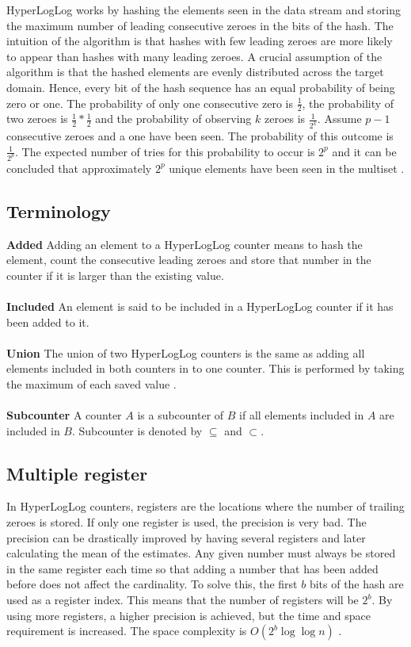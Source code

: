 HyperLogLog works by hashing the elements seen in the data stream and storing the maximum number of leading consecutive zeroes in the bits of the hash. The intuition of the algorithm is that hashes with few leading zeroes are more likely to appear than hashes with many leading zeroes. A crucial assumption of the algorithm is that the hashed elements are evenly distributed across the target domain. Hence, every bit of the hash sequence has an equal probability of being zero or one. The probability of only one consecutive zero is $\frac{1}{2}$, the probability of two zeroes is $\frac{1}{2}*\frac{1}{2}$ and the probability of observing $k$ zeroes is $\frac {1} {2^k}$. Assume $p-1$ consecutive zeroes and a one have been seen. The probability of this outcome is $\frac{1}{2^p}$. The expected number of tries for this probability to occur is $2^p$ and it can be concluded that approximately $2^p$ unique elements have been seen in the multiset \cite{hyperloglog}. 
\subsection{Terminology}
\textbf{Added }
Adding an element to a HyperLogLog counter means to hash the element, count the consecutive leading zeroes and store that number in the counter if it is larger than the existing value.\\\\
\textbf{Included }
An element is said to be included in a HyperLogLog counter if it has been added to it.\\\\
\textbf{Union }
The union of two HyperLogLog counters is the same as adding all elements included in both counters in to one counter. This is performed by taking the maximum of each saved value \cite{hyperanf}.\\\\
\textbf{Subcounter }
A counter $A$ is a subcounter of $B$ if all elements included in $A$ are included in $B$. Subcounter is denoted by $\subseteq$ and $\subset$.

\subsection{Multiple register}
In HyperLogLog counters, registers are the locations where the number of trailing zeroes is stored. If only one register is used, the precision is very bad. The precision can be drastically improved by having several registers and later calculating the mean of the estimates. Any given number must always be stored in the same register each time so that adding a number that has been added before does not affect the cardinality. To solve this, the first $b$ bits of the hash are used as a register index. This means that the number of registers will be $2^b$. By using more registers, a higher precision is achieved, but the time and space requirement is increased. The space complexity is $O(2^b\log\log n)$ \cite{hyperloglog}.


